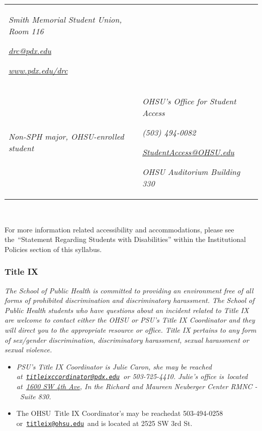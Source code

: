 \documentclass[
  letterpaper,
  DIV=11,
  numbers=noendperiod]{scrartcl}
\begin{document}
\begin{longtable}[]{@{}
  >{\raggedright\arraybackslash}p{}
  >{\raggedright\arraybackslash}p{}@{}}
\emph{Smith Memorial Student Union, Room 116}

\href{mailto:drc@pdx.edu}{\emph{drc@pdx.edu}}

\href{http://www.pdx.edu/drc}{\emph{www.pdx.edu/drc}} \\
\emph{Non-SPH major, OHSU-enrolled student} & \emph{OHSU's Office for
Student Access}

\emph{(503) 494-0082}

\href{mailto:StudentAccess@OHSU.edu}{\emph{StudentAccess@OHSU.edu}}

\emph{OHSU Auditorium Building 330} \\
\end{longtable}

~

For more information related accessibility and accommodations, please
see the~``Statement Regarding Students with Disabilities'' within the
Institutional Policies section of this syllabus.

\hypertarget{title-ix}{%
\subsubsection{Title IX}\label{title-ix}}

\emph{The School of Public Health is committed to providing an
environment free of all forms of prohibited discrimination and
discriminatory harassment. The School of Public Health students who have
questions about an incident related to Title IX are welcome to contact
either the OHSU or PSU's Title IX Coordinator and they will direct you
to the appropriate resource or office. Title IX pertains to any form of
sex/gender discrimination, discriminatory harassment, sexual harassment
or sexual violence.}

\begin{itemize}
\item
  \emph{PSU's Title IX Coordinator is Julie Caron, she may be reached
  at~\href{mailto:titleixccordinator@pdx.edu}{\nolinkurl{titleixccordinator@pdx.edu}}~or
  503-725-4410. Julie's office is~located
  at~\href{https://www.google.com/maps/search/1600+SW+4th+Ave?entry=gmail\&source=g}{1600
  SW 4th Ave}, In the Richard and Maureen Neuberger Center RMNC -~Suite
  830.}
\item
  The OHSU~Title IX Coordinator's may be reachedat 503-494-0258
  or~\href{mailto:titleix@ohsu.edu}{\nolinkurl{titleix@ohsu.edu}}~and is
  located at 2525 SW 3rd St.
\end{itemize}
\end{document}
